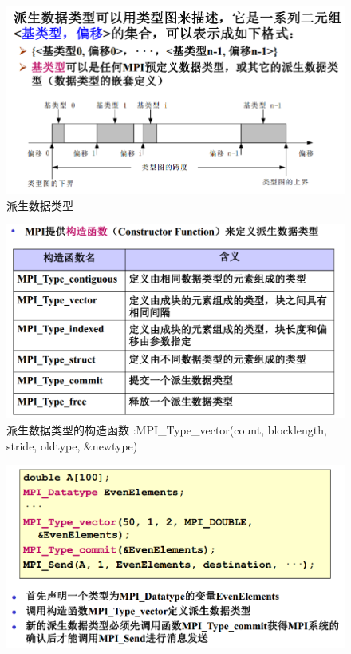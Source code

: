 \documentclass[UTF8,a4paper]{ctexart}
\begin{document}
\begin{figure}[H]
  \centering
  \includegraphics[scale = 0.3]{assets/ParallelComputing_a83f9.png}
  \caption{派生数据类型}
\end{figure}

\begin{figure}[H]
  \centering
  \includegraphics[scale = 0.3]{assets/ParallelComputing_29da9.png}
  \caption{派生数据类型的构造函数 :MPI\_Type\_vector(count, blocklength, stride,
oldtype, \&newtype)}
\end{figure}

\begin{figure}[H]
  \centering
  \includegraphics[scale = 0.3]{assets/ParallelComputing_ebae3.png}
\end{figure}
\end{document}
